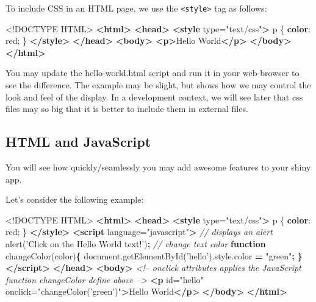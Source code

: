 \documentclass[]{book}
\newenvironment{Shaded}{\begin{snugshade}}{\end{snugshade}}
\newcommand{\AttributeTok}[1]{\textcolor[rgb]{0.77,0.63,0.00}{#1}}
\newcommand{\CommentTok}[1]{\textcolor[rgb]{0.56,0.35,0.01}{\textit{#1}}}
\newcommand{\DataTypeTok}[1]{\textcolor[rgb]{0.13,0.29,0.53}{#1}}
\newcommand{\DecValTok}[1]{\textcolor[rgb]{0.00,0.00,0.81}{#1}}
\newcommand{\KeywordTok}[1]{\textcolor[rgb]{0.13,0.29,0.53}{\textbf{#1}}}
\newcommand{\NormalTok}[1]{#1}
\newcommand{\OperatorTok}[1]{\textcolor[rgb]{0.81,0.36,0.00}{\textbf{#1}}}
\newcommand{\OtherTok}[1]{\textcolor[rgb]{0.56,0.35,0.01}{#1}}
\newcommand{\StringTok}[1]{\textcolor[rgb]{0.31,0.60,0.02}{#1}}
\newcommand{\VariableTok}[1]{\textcolor[rgb]{0.00,0.00,0.00}{#1}}
\begin{document}
To include CSS in an HTML page, we use the \texttt{\textless{}style\textgreater{}} tag as follows:

\begin{Shaded}
\begin{Highlighting}[]
\DataTypeTok{<!DOCTYPE }\NormalTok{HTML}\DataTypeTok{>}
\KeywordTok{<html>}
  \KeywordTok{<head>}
    \KeywordTok{<style}\OtherTok{ type=}\StringTok{"text/css"}\KeywordTok{>}
\NormalTok{      p \{}
        \KeywordTok{color}\NormalTok{: }\DecValTok{red}\NormalTok{;}
\NormalTok{      \}}
    \KeywordTok{</style>}
  \KeywordTok{</head>}
  \KeywordTok{<body>}
  \KeywordTok{<p>}\NormalTok{Hello World}\KeywordTok{</p>}
  \KeywordTok{</body>}
\KeywordTok{</html>}
\end{Highlighting}
\end{Shaded}

You may update the hello-world.html script and run it in your web-browser to see the difference. The example may be slight, but shows how we may control the look and feel of the display. In a development context, we will see later that css files may so big that it is better to include them in external files.

\hypertarget{html-and-javascript}{%
\subsection{HTML and JavaScript}\label{html-and-javascript}}

You will see how quickly/seamlessly you may add awesome features to your shiny app.

Let's consider the following example:

\begin{Shaded}
\begin{Highlighting}[]
\DataTypeTok{<!DOCTYPE }\NormalTok{HTML}\DataTypeTok{>}
\KeywordTok{<html>}
  \KeywordTok{<head>}
    \KeywordTok{<style}\OtherTok{ type=}\StringTok{"text/css"}\KeywordTok{>}
\NormalTok{      p \{}
        \KeywordTok{color}\NormalTok{: }\DecValTok{red}\NormalTok{;}
\NormalTok{      \}}
    \KeywordTok{</style>}
    \KeywordTok{<script}\OtherTok{ language=}\StringTok{"javascript"}\KeywordTok{>}
      \CommentTok{// displays an alert }
      \AttributeTok{alert}\NormalTok{(}\StringTok{'Click on the Hello World text!'}\NormalTok{)}\OperatorTok{;}
      \CommentTok{// change text color}
      \KeywordTok{function} \AttributeTok{changeColor}\NormalTok{(color)}\OperatorTok{\{}
        \VariableTok{document}\NormalTok{.}\AttributeTok{getElementById}\NormalTok{(}\StringTok{'hello'}\NormalTok{).}\VariableTok{style}\NormalTok{.}\AttributeTok{color} \OperatorTok{=} \StringTok{"green"}\OperatorTok{;}
      \OperatorTok{\}}
    \KeywordTok{</script>}
  \KeywordTok{</head>}
  \KeywordTok{<body>}
    \CommentTok{<!-- onclick attributes applies the JavaScript function changeColor define above -->}
    \KeywordTok{<p}\OtherTok{ id=}\StringTok{"hello"}\OtherTok{ onclick=}\StringTok{"changeColor('green')"}\KeywordTok{>}\NormalTok{Hello World}\KeywordTok{</p>}
  \KeywordTok{</body>}
\KeywordTok{</html>}
\end{Highlighting}
\end{Shaded}
\end{document}
